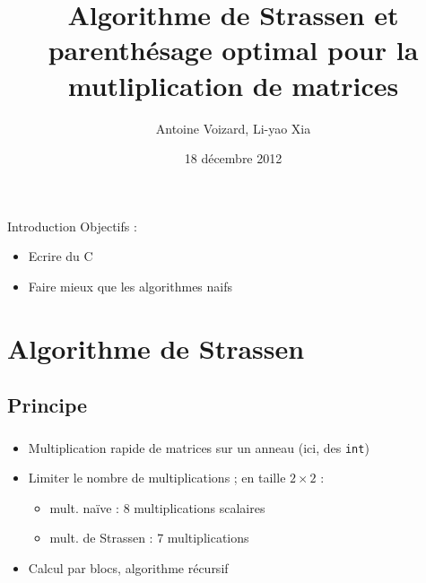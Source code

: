 \documentclass{beamer}
\title[Projet de programmation et d'algorithmique]{
Algorithme de Strassen et parenthésage optimal
pour la mutliplication de matrices}
\author{Antoine Voizard, Li-yao Xia}
\date{18 décembre 2012}
\begin{document}
\begin{frame}
\titlepage
\end{frame}


\begin{frame}{Introduction}
  Objectifs :
  \begin{itemize}
    \item Ecrire du C
    \item Faire mieux que les algorithmes naifs
  \end{itemize}
\end{frame}

\section{Algorithme de Strassen}

\subsection{Principe}
\begin{frame}[fragile]
  \frametitle{\insertsubsection}
  \begin{itemize}
    \item Multiplication rapide de matrices sur un anneau
    (ici, des \verb=int=)
    \item Limiter le nombre de multiplications ; en taille $2 \times 2$ :
    \begin{itemize}
      \item mult. naïve : 8 multiplications scalaires
      \item mult. de Strassen : 7 multiplications
    \end{itemize}
    \item Calcul par blocs, algorithme récursif
  \end{itemize}
\end{frame}
\end{document}
